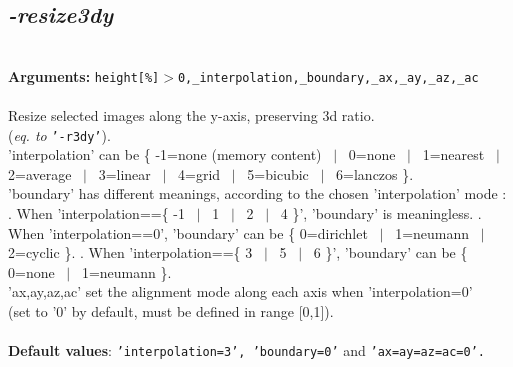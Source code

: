 \documentclass[a4paper,11pt,twoside]{book}
\begin{document}
\subsection{\emph{-resize3dy} }\vspace*{-0.5em}
~\\\textbf{Arguments: } 
{\small \texttt{height[\%]$>$0,\_interpolation,\_boundary,\_ax,\_ay,\_az,\_ac}}\\~\\
Resize selected images along the y-axis, preserving 3d ratio.
~\\(\emph{eq. to} {\small \texttt{'-r3dy'}}).
~\\'interpolation' can be \{ -1=none (memory content) ~$|$~ 0=none ~$|$~ 1=nearest ~$|$~ 2=average ~$|$~ 3=linear ~$|$~ 4=grid ~$|$~ 5=bicubic ~$|$~ 6=lanczos \}.
~\\'boundary' has different meanings, according to the chosen 'interpolation' mode :
. When 'interpolation==\{ -1 ~$|$~ 1 ~$|$~ 2 ~$|$~ 4 \}', 'boundary' is meaningless.
. When 'interpolation==0', 'boundary' can be \{ 0=dirichlet ~$|$~ 1=neumann ~$|$~ 2=cyclic \}.
. When 'interpolation==\{ 3 ~$|$~ 5 ~$|$~ 6 \}', 'boundary' can be \{ 0=none ~$|$~ 1=neumann \}.
~\\'ax,ay,az,ac' set the alignment mode along each axis when 'interpolation=0'
~\\(set to '0' by default, must be defined in range [0,1]).
~\\~\\\textbf{Default values}: {\small \texttt{'interpolation=3', 'boundary=0'} and \texttt{'ax=ay=az=ac=0'.}}
\end{document}
